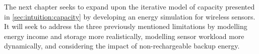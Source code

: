 The next chapter seeks to expand upon the iterative model of capacity presented in \cref{sec:intuition:capacity} by developing an energy simulation for wireless sensors. 
It will seek to address the three previously mentioned limitations by modelling energy income and storage more realistically, modelling sensor workload more dynamically, and considering the impact of non-rechargeable backup energy. 

%    
%    
%    
%     
%    
%    
%    
%     
%    
%     
%    
%
%  
%   
%    
%    
%    
%   
%    
%    
%    

